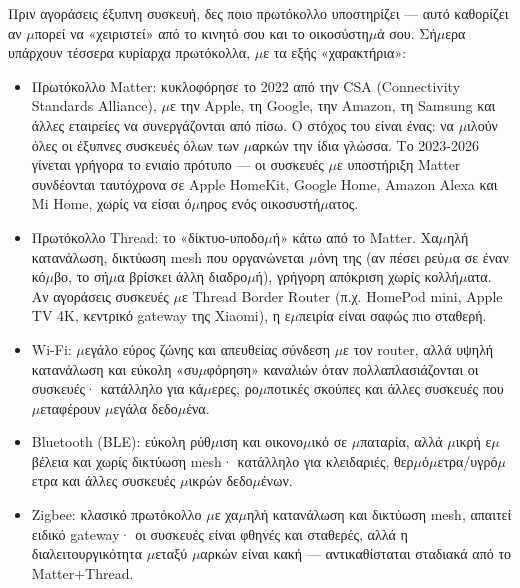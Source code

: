 


Πριν αγοράσεις έξυπνη συσκευή, δες ποιο πρωτόκολλο υποστηρίζει — αυτό καθορίζει αν $\mu$πορεί να «χειριστεί» από το κινητό σου και το οικοσύστη$\mu$ά σου. Σή$\mu$ερα υπάρχουν τέσσερα κυρίαρχα πρωτόκολλα, $\mu$ε τα εξής «χαρακτήρια»:

\begin{itemize}
  \item Πρωτόκολλο Matter: κυκλοφόρησε το 2022 από την CSA (Connectivity Standards Alliance), $\mu$ε την Apple, τη Google, την Amazon, τη Samsung και άλλες εταιρείες να συνεργάζονται από πίσω. Ο στόχος του είναι ένας: να $\mu$ιλούν όλες οι έξυπνες συσκευές όλων των $\mu$αρκών την ίδια γλώσσα. Το 2023-2026 γίνεται γρήγορα το ενιαίο πρότυπο — οι συσκευές $\mu$ε υποστήριξη Matter συνδέονται ταυτόχρονα σε Apple HomeKit, Google Home, Amazon Alexa και Mi Home, χωρίς να είσαι ό$\mu$ηρος ενός οικοσυστή$\mu$ατος.
  \item Πρωτόκολλο Thread: το «δίκτυο-υποδο$\mu$ή» κάτω από το Matter. Χα$\mu$ηλή κατανάλωση, δικτύωση mesh που οργανώνεται $\mu$όνη της (αν πέσει ρεύ$\mu$α σε έναν κό$\mu$βο, το σή$\mu$α βρίσκει άλλη διαδρο$\mu$ή), γρήγορη απόκριση χωρίς κολλή$\mu$ατα. Αν αγοράσεις συσκευές $\mu$ε Thread Border Router (π.χ. HomePod mini, Apple TV 4K, κεντρικό gateway της Xiaomi), η ε$\mu$πειρία είναι σαφώς πιο σταθερή.
  \item Wi-Fi: $\mu$εγάλο εύρος ζώνης και απευθείας σύνδεση $\mu$ε τον router, αλλά υψηλή κατανάλωση και εύκολη «συ$\mu$φόρηση» καναλιών όταν πολλαπλασιάζονται οι συσκευές· κατάλληλο για κά$\mu$ερες, ρο$\mu$ποτικές σκούπες και άλλες συσκευές που $\mu$εταφέρουν $\mu$εγάλα δεδο$\mu$ένα.
  \item Bluetooth (BLE): εύκολη ρύθ$\mu$ιση και οικονο$\mu$ικό σε $\mu$παταρία, αλλά $\mu$ικρή ε$\mu$βέλεια και χωρίς δικτύωση mesh· κατάλληλο για κλειδαριές, θερ$\mu$ό$\mu$ετρα/υγρό$\mu$ετρα και άλλες συσκευές $\mu$ικρών δεδο$\mu$ένων.
  \item Zigbee: κλασικό πρωτόκολλο $\mu$ε χα$\mu$ηλή κατανάλωση και δικτύωση mesh, απαιτεί ειδικό gateway· οι συσκευές είναι φθηνές και σταθερές, αλλά η διαλειτουργικότητα $\mu$εταξύ $\mu$αρκών είναι κακή — αντικαθίσταται σταδιακά από το Matter+Thread.
\end{itemize}


